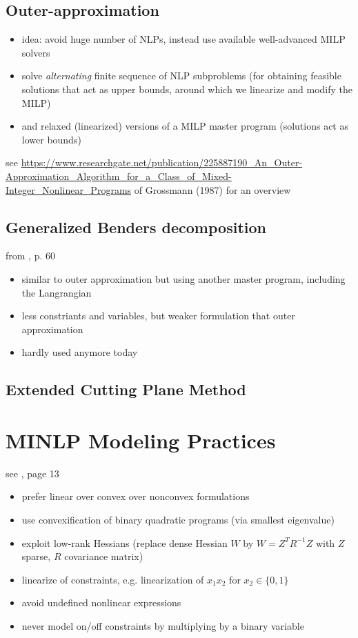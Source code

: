 \documentclass{article}
\begin{document}
\subsection{Outer-approximation}
\begin{itemize}
\item idea: avoid huge number of NLPs, instead use available well-advanced MILP solvers
\item solve \emph{alternating} finite sequence of NLP subproblems (for obtaining feasible solutions that act as upper bounds, around which we linearize and modify the MILP)
\item and relaxed (linearized) versions of a MILP master program (solutions act as lower bounds)
\end{itemize}

\noindent
see \url{https://www.researchgate.net/publication/225887190_An_Outer-Approximation_Algorithm_for_a_Class_of_Mixed-Integer_Nonlinear_Programs} of Grossmann (1987) for an overview

\subsection{Generalized Benders decomposition}
from \cite{sager2005numerical}, p. 60
\begin{itemize}
\item similar to outer approximation but using another master program, including the Langrangian
\item less constriants and variables, but weaker formulation that outer approximation
\item hardly used anymore today
\end{itemize}

\subsection{Extended Cutting Plane Method}

\section{MINLP Modeling Practices}
see \cite{Belotti13}, page 13

\begin{itemize}
\item prefer linear over convex over nonconvex formulations
\item use convexification of binary quadratic programs (via smallest eigenvalue)
\item exploit low-rank Hessians (replace dense Hessian $W$ by $W = Z^T R^{-1} Z$ with $Z$ sparse, $R$ covariance matrix)
\item linearize of constraints, e.g. linearization of $x_1x_2$ for $x_2\in\{0,1\}$
\item avoid undefined nonlinear expressions
\item never model on/off constraints by multiplying by a binary variable
\end{itemize}
\end{document}
